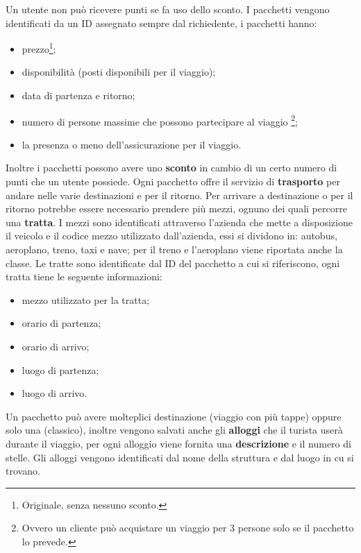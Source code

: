 Un utente non può ricevere punti se fa uso dello sconto.
%
%
I pacchetti vengono identificati da un ID assegnato sempre dal richiedente, i pacchetti hanno:
\begin{multicols}{2}
    \begin{itemize}
        \item prezzo\footnote{Originale, senza nessuno sconto.};
        \item disponibilità (posti disponibili per il viaggio);
        \item data di partenza e ritorno;
        \item numero di persone massime che possono partecipare al viaggio%
        \footnote{Ovvero un cliente può acquistare un viaggio per 3 persone solo se il pacchetto lo prevede.};
        \item la presenza o meno dell'assicurazione per il viaggio.
    \end{itemize}
 \end{multicols}
Inoltre i pacchetti possono avere uno \textbf{sconto} in cambio di un certo numero di punti che un utente possiede.
%
%
Ogni pacchetto offre il servizio di \textbf{trasporto} per andare nelle varie destinazioni e per il ritorno. Per arrivare a destinazione o per il ritorno potrebbe essere necessario prendere più mezzi, ognuno dei quali percorre una \textbf{tratta}. I mezzi sono identificati attraverso l'azienda che mette a disposizione il veicolo e il codice mezzo utilizzato dall'azienda, essi si dividono in: autobus, aeroplano, treno, taxi e nave; per il treno e l'aeroplano viene riportata anche la classe. Le tratte sono identificate dal ID del pacchetto a cui si riferiscono, ogni tratta tiene le seguente informazioni:
\begin{multicols}{2}
    \begin{itemize}
        \item mezzo utilizzato per la tratta;
        \item orario di partenza;
        \item orario di arrivo;
        \item luogo di partenza;
        \item luogo di arrivo.
    \end{itemize}
\end{multicols}
%
%
Un pacchetto può avere molteplici destinazione (viaggio con più tappe) oppure solo una (classico), inoltre vengono salvati anche gli \textbf{alloggi} che il turista userà durante il viaggio, per ogni alloggio viene fornita una \textbf{descrizione} e il numero di stelle. Gli alloggi vengono identificati dal nome della struttura e dal luogo in cu si trovano.
